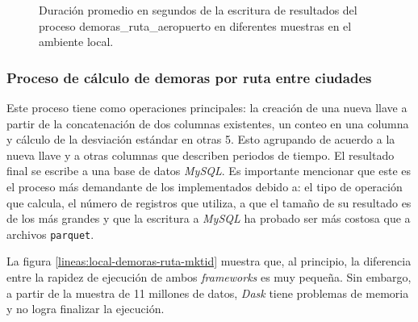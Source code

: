 \begin{figure}
\centering
{}
\caption{Duración promedio en segundos de la escritura de resultados del proceso demoras\_ruta\_aeropuerto en diferentes muestras en el ambiente local.}
\label{lineas:local-demoras-ruta-aeropuerto-write}
\end{figure}

\subsubsection{Proceso de cálculo de demoras por ruta entre ciudades}

Este proceso tiene como operaciones principales: la creación de una nueva llave a partir de la concatenación de dos columnas existentes, un conteo en una columna y cálculo de la desviación estándar en otras 5. Esto agrupando de acuerdo a la nueva llave y a otras columnas que describen periodos de tiempo. El resultado final se escribe a una base de datos \textit{MySQL}. Es importante mencionar que este es el proceso más demandante de los implementados debido a: el tipo de operación que calcula, el número de registros que utiliza, a que el tamaño de su resultado es de los más grandes y que la escritura a \textit{MySQL} ha probado ser más costosa que a archivos \texttt{parquet}.

La figura \ref{lineas:local-demoras-ruta-mktid} muestra que, al principio, la diferencia entre la rapidez de ejecución de ambos \textit{frameworks} es muy pequeña. Sin embargo, a partir de la muestra de 11 millones de datos, \textit{Dask} tiene problemas de memoria y no logra finalizar la ejecución.

